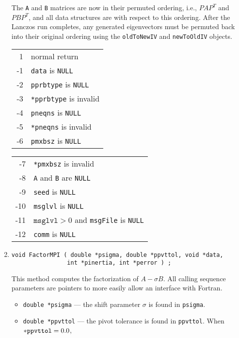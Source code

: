 \begin{enumerate}
\begin{itemize}
\end{itemize}
The {\tt A} and {\tt B} matrices are now in their permuted ordering,
i.e., $PAP^T$ and $PBP^T$, and all data structures are with respect to
this ordering. After the Lanczos run completes, any generated
eigenvectors must be permuted back into their original ordering using
the {\tt oldToNewIV} and {\tt newToOldIV} objects.
\par {}
\begin{center}
\begin{tabular}[t]{rl}
~1 & normal return \\
-1 & \texttt{data} is \texttt{NULL} \\
-2 & \texttt{pprbtype} is \texttt{NULL} \\
-3 & \texttt{*pprbtype} is invalid \\
-4 & \texttt{pneqns} is \texttt{NULL} \\
-5 & \texttt{*pneqns} is invalid \\
-6 & \texttt{pmxbsz} is \texttt{NULL}
\end{tabular}
\begin{tabular}[t]{rl}
-7 & \texttt{*pmxbsz} is invalid \\
-8 & \texttt{A} and \texttt{B} are \texttt{NULL} \\
-9 & \texttt{seed} is \texttt{NULL} \\
-10 & \texttt{msglvl} is \texttt{NULL} \\
-11 & $\texttt{msglvl} > 0$ and \texttt{msgFile} is \texttt{NULL} \\
-12 & \texttt{comm} is \texttt{NULL} 
\end{tabular}
\end{center}
\item
\begin{verbatim}
void FactorMPI ( double *psigma, double *ppvttol, void *data, 
                int *pinertia, int *perror ) ;
\end{verbatim}
This method computes the factorization of $A - \sigma B$.
All calling sequence parameters are pointers to more
easily allow an interface with Fortran.
\begin{itemize}
\item {\tt double *psigma} --- the shift parameter $\sigma$ is
      found in {\tt *psigma}.
\item {\tt double *ppvttol} --- the pivot tolerance is
      found in {\tt *ppvttol}. When ${\tt *ppvttol} = 0.0$, 

\end{itemize}
\end{enumerate}
